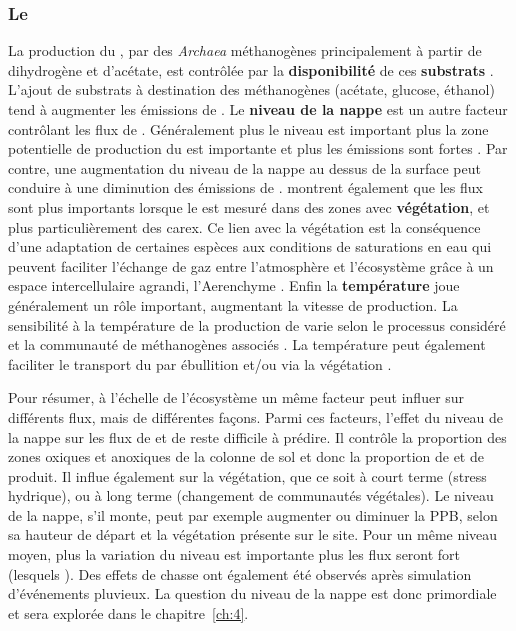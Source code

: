 \subsubsection{Le \chh}

La production du \chh, par des \textit{Archaea} méthanogènes principalement à partir de dihydrogène et d'acétate, est contrôlée par la \textbf{disponibilité} de ces \textbf{substrats} \citep{segers1998}.
L'ajout de substrats à destination des méthanogènes (acétate, glucose, éthanol) tend à augmenter les émissions de \chh \citep{coles2002}.
Le \textbf{niveau de la nappe} est un autre facteur contrôlant les flux de \chh.
Généralement plus le niveau est important plus la zone potentielle de production du \chh est importante et plus les émissions sont fortes \citep{pelletier2007}.
Par contre, une augmentation du niveau de la nappe au dessus de la surface peut conduire à une diminution des émissions de \chh \citep{bubier1995}.
\citet{pelletier2007} montrent également que les flux sont plus importants lorsque le \chh est mesuré dans des zones avec \textbf{végétation}, et plus particulièrement des carex.
Ce lien avec la végétation est la conséquence d'une adaptation de certaines espèces aux conditions de saturations en eau qui peuvent faciliter l'échange de gaz entre l'atmosphère et l'écosystème grâce à un espace intercellulaire agrandi, l'Aerenchyme \citep{rydin2013d}.
Enfin la \textbf{température} joue généralement un rôle important, augmentant la vitesse de production.
La sensibilité à la température de la production de \chh varie selon le processus considéré et la communauté de méthanogènes associés \citep{segers1998}.
La température peut également faciliter le transport du \chh par ébullition et/ou via la végétation \citep{lai2009}.

Pour résumer, à l'échelle de l'écosystème un même facteur peut influer sur différents flux, mais de différentes façons.
Parmi ces facteurs, l'effet du niveau de la nappe sur les flux de \coo et de \chh reste difficile à prédire.
Il contrôle la proportion des zones oxiques et anoxiques de la colonne de sol et donc la proportion de \coo et de \chh produit.
Il influe également sur la végétation, que ce soit à court terme (stress hydrique), ou à long terme (changement de communautés végétales).
Le niveau de la nappe, s'il monte, peut par exemple augmenter ou diminuer la PPB, selon sa hauteur de départ et la végétation présente sur le site.
Pour un même niveau moyen, plus la variation du niveau est importante plus les flux seront fort (lesquels \plop).
Des effets de chasse ont également été observés après simulation d’événements pluvieux.
La question du niveau de la nappe est donc primordiale et sera explorée dans le chapitre~\ref{ch:4}.



